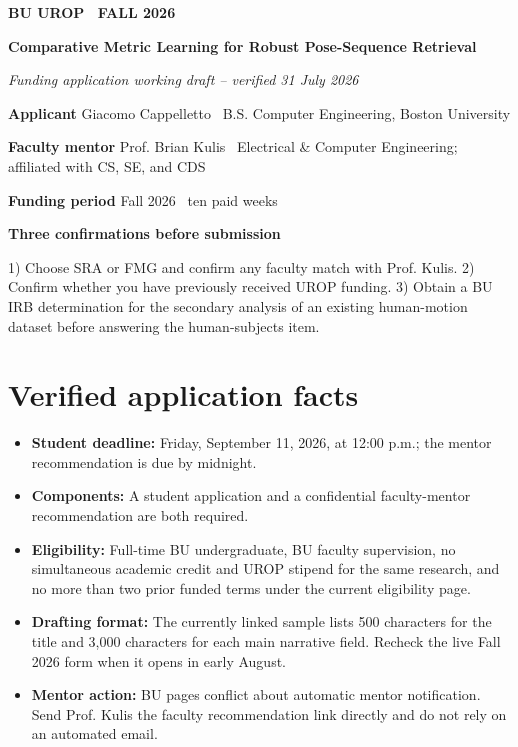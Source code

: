 \documentclass[11pt,letterpaper]{article}
\begin{document}
\begin{center}
  {\color{Accent}\bfseries\small BU UROP \textperiodcentered\ FALL 2026\par}
  \vspace{7pt}
  {\color{DarkAccent}\bfseries\fontsize{22}{26}\selectfont
    Comparative Metric Learning for Robust Pose-Sequence Retrieval\par}
  \vspace{7pt}
  {\color{Muted}\itshape Funding application working draft -- verified 31 July 2026\par}
\end{center}

\vspace{7pt}

\textbf{\color{DarkAccent}Applicant}\quad
Giacomo Cappelletto \textperiodcentered\ B.S. Computer Engineering, Boston University

\textbf{\color{DarkAccent}Faculty mentor}\quad
Prof. Brian Kulis \textperiodcentered\ Electrical \& Computer Engineering; affiliated with CS, SE, and CDS

\textbf{\color{DarkAccent}Funding period}\quad
Fall 2026 \textperiodcentered\ ten paid weeks

\begin{warningbox}
\textbf{\color{DarkAccent}Three confirmations before submission}

1) Choose SRA or FMG and confirm any faculty match with Prof. Kulis.
2) Confirm whether you have previously received UROP funding.
3) Obtain a BU IRB determination for the secondary analysis of an existing human-motion dataset before answering the human-subjects item.
\end{warningbox}

\section*{Verified application facts}

\begin{itemize}
  \item \textbf{Student deadline:} Friday, September 11, 2026, at 12:00 p.m.; the mentor recommendation is due by midnight.
  \item \textbf{Components:} A student application and a confidential faculty-mentor recommendation are both required.
  \item \textbf{Eligibility:} Full-time BU undergraduate, BU faculty supervision, no simultaneous academic credit and UROP stipend for the same research, and no more than two prior funded terms under the current eligibility page.
  \item \textbf{Drafting format:} The currently linked sample lists 500 characters for the title and 3,000 characters for each main narrative field. Recheck the live Fall 2026 form when it opens in early August.
  \item \textbf{Mentor action:} BU pages conflict about automatic mentor notification. Send Prof. Kulis the faculty recommendation link directly and do not rely on an automated email.
\end{itemize}
\end{document}
